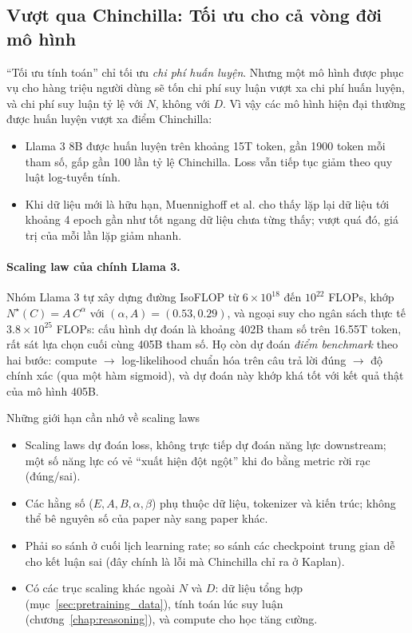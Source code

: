 \subsection{Vượt qua Chinchilla: Tối ưu cho cả vòng đời mô hình}
\label{ssec:beyond_chinchilla}
“Tối ưu tính toán” chỉ tối ưu \emph{chi phí huấn luyện}. Nhưng một mô hình được phục vụ cho hàng triệu người dùng sẽ tốn chi phí suy luận vượt xa chi phí huấn luyện, và chi phí suy luận tỷ lệ với $N$, không với $D$. Vì vậy các mô hình hiện đại thường được huấn luyện vượt xa điểm Chinchilla:
\begin{itemize}
	\item Llama 3 8B được huấn luyện trên khoảng 15T token, gần 1900 token mỗi tham số, gấp gần 100 lần tỷ lệ Chinchilla. Loss vẫn tiếp tục giảm theo quy luật log-tuyến tính.
	\item Khi dữ liệu mới là hữu hạn, Muennighoff et al. \cite{muennighoff2023scaling} cho thấy lặp lại dữ liệu tới khoảng 4 epoch gần như tốt ngang dữ liệu chưa từng thấy; vượt quá đó, giá trị của mỗi lần lặp giảm nhanh.
\end{itemize}

\paragraph{Scaling law của chính Llama 3.} Nhóm Llama 3 \cite{grattafiori2024llama3} tự xây dựng đường IsoFLOP từ $6\times10^{18}$ đến $10^{22}$ FLOPs, khớp $N^\star(C) = A\,C^{\alpha}$ với $(\alpha, A) = (0.53, 0.29)$, và ngoại suy cho ngân sách thực tế $3.8 \times 10^{25}$ FLOPs: cấu hình dự đoán là khoảng 402B tham số trên 16.55T token, rất sát lựa chọn cuối cùng 405B tham số. Họ còn dự đoán \emph{điểm benchmark} theo hai bước: compute $\rightarrow$ log-likelihood chuẩn hóa trên câu trả lời đúng $\rightarrow$ độ chính xác (qua một hàm sigmoid), và dự đoán này khớp khá tốt với kết quả thật của mô hình 405B.

\begin{pitfall}{Những giới hạn cần nhớ về scaling laws}
\begin{itemize}
	\item Scaling laws dự đoán loss, không trực tiếp dự đoán năng lực downstream; một số năng lực có vẻ “xuất hiện đột ngột” khi đo bằng metric rời rạc (đúng/sai).
	\item Các hằng số ($E, A, B, \alpha, \beta$) phụ thuộc dữ liệu, tokenizer và kiến trúc; không thể bê nguyên số của paper này sang paper khác.
	\item Phải so sánh ở cuối lịch learning rate; so sánh các checkpoint trung gian dễ cho kết luận sai (đây chính là lỗi mà Chinchilla chỉ ra ở Kaplan).
	\item Có các trục scaling khác ngoài $N$ và $D$: dữ liệu tổng hợp (mục~\ref{sec:pretraining_data}), tính toán lúc suy luận (chương~\ref{chap:reasoning}), và compute cho học tăng cường.
\end{itemize}
\end{pitfall}

